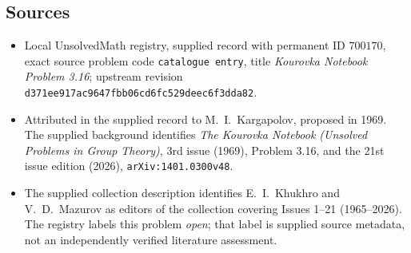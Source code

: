 \documentclass[11pt]{article}
\begin{document}
\subsection{Sources}
\begin{itemize}
\item Local UnsolvedMath registry, supplied record with permanent ID \(700170\), exact source problem code \texttt{catalogue entry}, title \emph{Kourovka Notebook Problem 3.16}; upstream revision \texttt{d371ee917ac9647fbb06cd6fc529deec6f3dda82}.
\item Attributed in the supplied record to M.\ I.\ Kargapolov, proposed in 1969. The supplied background identifies \emph{The Kourovka Notebook (Unsolved Problems in Group Theory)}, 3rd issue (1969), Problem 3.16, and the 21st issue edition (2026), \texttt{arXiv:1401.0300v48}.
\item The supplied collection description identifies E.\ I.\ Khukhro and V.\ D.\ Mazurov as editors of the collection covering Issues 1--21 (1965--2026). The registry labels this problem \emph{open}; that label is supplied source metadata, not an independently verified literature assessment.
\end{itemize}
\end{document}
